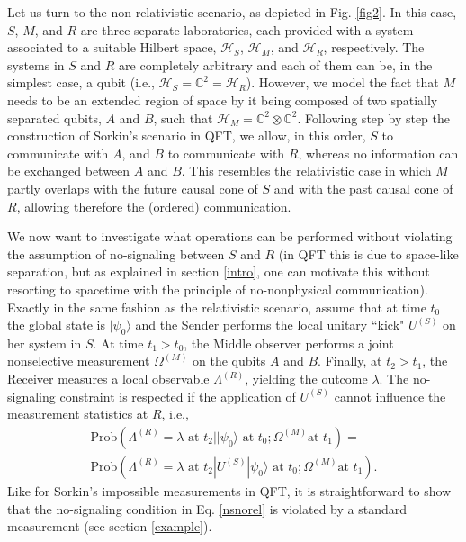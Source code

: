 \documentclass[a4paper,twocolumn,11pt,accepted=2024-02-14]{quantumarticle}
\newcommand{\ket}[1]{| {#1} \rangle} %
\begin{document}
Let us turn to the non-relativistic scenario, as depicted in Fig. \ref{fig2}. In this case, $S$, $M$, and $R$ are three separate laboratories, each provided with a system associated to a suitable Hilbert space, $\mathcal{H}_S$,  $\mathcal{H}_M$, and  $\mathcal{H}_R$, respectively. The systems in $S$ and $R$ are completely arbitrary and each of them can be, in the simplest case,  a qubit (i.e., $\mathcal{H}_S=\mathbb{C}^2=\mathcal{H}_R$). However, we model the fact that $M$ needs to be an extended region of space by it being composed of two spatially separated qubits, $A$ and $B$, such that $\mathcal{H}_M=\mathbb{C}^2 \otimes \mathbb{C}^2$. Following step by step the construction of Sorkin's scenario in QFT, we allow, in this order, $S$ to communicate with $A$, and $B$ to communicate with $R$, whereas no information can be exchanged between $A$ and $B$. This resembles the relativistic case in which $M$ partly overlaps with the future causal cone of $S$ and with the past causal cone of $R$, allowing therefore the (ordered) communication.

We now want to investigate what operations can be performed without violating the assumption of no-signaling between $S$ and $R$ (in QFT this is due to space-like separation, but as explained in section \ref{intro}, one can motivate this without resorting to spacetime with the principle of no-nonphysical communication).
Exactly in the same fashion as the relativistic scenario, assume that at time $t_0$ the global state is $\ket{\psi_0}$ and the Sender performs the local  unitary ``kick" $U^{(S)}$ on her system in $S$. At time $t_1 >t_0$, the Middle observer performs a joint nonselective measurement $\Omega^{(M)}$ on the qubits $A$ and $B$. Finally, at $t_2 > t_1$, the Receiver measures a local observable $\Lambda^{(R)}$, yielding the outcome $\lambda$. The no-signaling constraint is respected if the application of $U^{(S)}$ cannot influence the measurement statistics at $R$, i.e.,  
\begin{eqnarray}
\label{nsnorel}
\text{Prob}(\Lambda^{(R)}=\lambda \text{ at } t_2 | \ket{\psi_0} \text{ at } t_0; \Omega^{(M)} \text{at } t_1)=\\
\text{Prob}(\Lambda^{(R)}=\lambda \text{ at } t_2 | U^{(S)}\ket{\psi_0} \text{ at } t_0; \Omega^{(M)} \text{at } t_1).\nonumber
\end{eqnarray}
Like for Sorkin's impossible measurements in QFT, it is straightforward to show  that the no-signaling condition in Eq. \eqref{nsnorel} is violated by a standard measurement (see section \ref{example}). 
\end{document}
